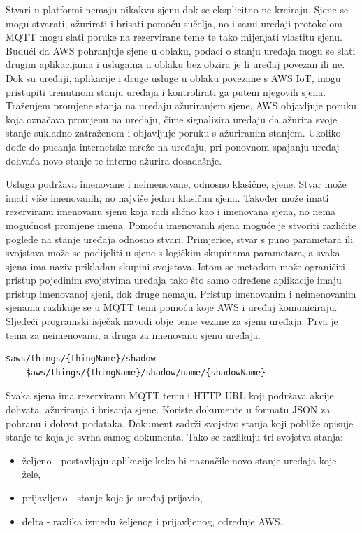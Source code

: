 Stvari  u platformi nemaju nikakvu sjenu dok se eksplicitno ne kreiraju. Sjene se mogu stvarati, ažurirati i brisati pomoću sučelja, no i sami uređaji protokolom MQTT mogu slati poruke na rezervirane teme te tako mijenjati vlastitu sjenu. Budući da AWS pohranjuje sjene u oblaku, podaci o stanju uređaja mogu se slati drugim aplikacijama i uslugama u oblaku bez obzira je li uređaj povezan ili ne.  Dok su uređaji, aplikacije i druge usluge u oblaku povezane s AWS IoT, mogu pristupiti trenutnom stanju uređaja i kontrolirati ga putem njegovih sjena. Traženjem promjene stanja na uređaju ažuriranjem sjene, AWS objavljuje poruku koja označava promjenu na uređaju, čime signalizira uređaju da ažurira svoje stanje sukladno zatraženom i objavljuje poruku s ažuriranim stanjem. Ukoliko dođe do pucanja internetske mreže na uređaju, pri ponovnom spajanju uređaj dohvaća novo stanje te interno ažurira dosadašnje.

Usluga podržava imenovane i neimenovane, odnosno klasične, sjene. Stvar može imati više imenovanih, no najviše jednu klasičnu sjenu. Također može imati rezerviranu imenovanu sjenu koja radi slično kao i imenovana sjena, no nema mogućnost promjene imena. Pomoću imenovanih sjena moguće je stvoriti različite poglede na stanje uređaja odnosno stvari. Primjerice, stvar s puno parametara ili svojstava može se podijeliti u sjene s logičkim skupinama parametara, a svaka sjena ima naziv prikladan skupini svojstava. Istom se metodom može ograničiti pristup pojedinim svojstvima uređaja tako što samo određene aplikacije imaju pristup imenovanoj sjeni, dok druge nemaju. Pristup imenovanim i neimenovanim sjenama razlikuje se u MQTT temi pomoću koje AWS i uređaj komuniciraju. Sljedeći programski isječak navodi obje teme vezane za sjenu uređaja. Prva je tema za neimenovanu, a druga za imenovanu sjenu uređaja. 

\begin{lstlisting}[caption={Teme za sjene uređaja}]
	$aws/things/{thingName}/shadow
	$aws/things/{thingName}/shadow/name/{shadowName}
\end{lstlisting}

Svaka sjena ima rezerviranu MQTT temu i HTTP URL koji podržava akcije dohvata, ažuriranja i brisanja sjene. Koriste dokumente u formatu JSON za pohranu i dohvat podataka. Dokument sadrži svojstvo stanja koji pobliže opisuje stanje te koja je svrha samog dokumenta. Tako se razlikuju tri svojstva stanja:
\begin{itemize}
	\item željeno  - postavljaju aplikacije kako bi naznačile novo stanje uređaja koje žele,
	\item prijavljeno  - stanje koje je uređaj prijavio,
	\item delta - razlika između željenog i prijavljenog, određuje AWS.
\end{itemize}

